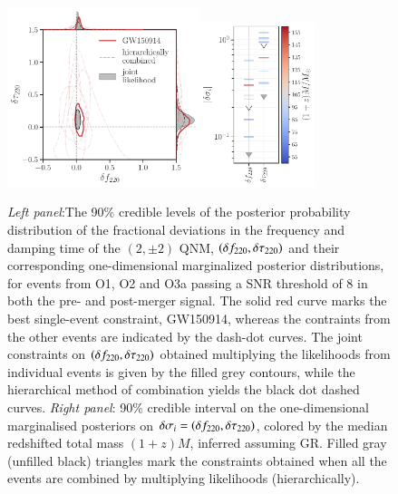 \begin{figure}
        \includegraphics[width=0.5\textwidth]{figures/rin_pseob_results_v2.pdf}\includegraphics[width=0.3\textwidth]{figures/rin_all_events_bounds.pdf}
        \caption{\emph{Left panel}:The 90\% credible levels of the posterior probability distribution of the fractional deviations in the frequency and damping time of the $(2,\pm 2)$ QNM, $(\delta f_{\text{220}},\delta \tau_{\text{220}})$ and their corresponding one-dimensional marginalized posterior distributions, for events from O1, O2 and O3a passing a SNR threshold of $8$ in both the pre- and post-merger signal. The solid red curve marks the best single-event constraint, GW150914, whereas the contraints from the other events are indicated by the dash-dot curves. The joint constraints on $(\delta f_{\text{220}},\delta \tau_{\text{220}})$ obtained multiplying the likelihoods from individual events is given by the filled grey contours, while the hierarchical method of combination yields the black dot dashed curves. \emph{Right panel}: 90\% credible interval on the one-dimensional marginalised posteriors on $\delta \sigma_i=(\delta f_{\text{220}},\delta \tau_{\text{220}})$, colored by the median redshifted total mass $(1 + z)M$, inferred assuming GR. Filled gray (unfilled black) triangles mark the constraints obtained when all the events are combined by multiplying likelihoods (hierarchically).}
        \label{fig:o1o2_events}
\end{figure}


